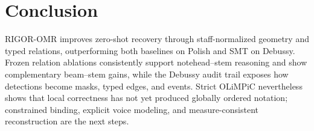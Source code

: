 \section{Conclusion}
RIGOR-OMR improves zero-shot recovery through staff-normalized geometry and typed relations, outperforming both baselines on Polish and SMT on Debussy. Frozen relation ablations consistently support notehead--stem reasoning and show complementary beam--stem gains, while the Debussy audit trail exposes how detections become masks, typed edges, and events. Strict OLiMPiC nevertheless shows that local correctness has not yet produced globally ordered notation; constrained binding, explicit voice modeling, and measure-consistent reconstruction are the next steps.
